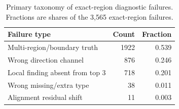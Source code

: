 \begin{table}[t]
\caption{Primary taxonomy of exact-region diagnostic failures. Fractions are
shares of the 3,565 exact-region failures.}
\label{tab:feedback-failures}
\centering
\scriptsize
\setlength{\tabcolsep}{3pt}
\begin{tabular}{lrr}
\toprule
Failure type & Count & Fraction \\
\midrule
Multi-region/boundary truth & 1922 & 0.539 \\
Wrong direction channel & 876 & 0.246 \\
Local finding absent from top 3 & 718 & 0.201 \\
Wrong missing/extra type & 38 & 0.011 \\
Alignment residual shift & 11 & 0.003 \\
\bottomrule
\end{tabular}
\end{table}
